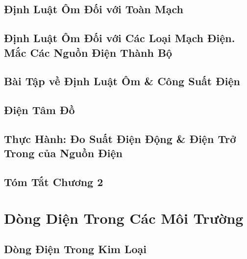\documentclass[oneside]{book}
\numberwithin{equation}{section}
\begin{document}

\section{Định Luật Ôm Đối với Toàn Mạch}


\section{Định Luật Ôm Đối với Các Loại Mạch Điện. Mắc Các Nguồn Điện Thành Bộ}


\section{Bài Tập về Định Luật Ôm \& Công Suất Điện}


\section{Điện Tâm Đồ}


\section{Thực Hành: Đo Suất Điện Động \& Điện Trở Trong của Nguồn Điện}


\section{Tóm Tắt Chương 2}


\chapter{Dòng Diện Trong Các Môi Trường}

\section{Dòng Điện Trong Kim Loại}
\end{document}
